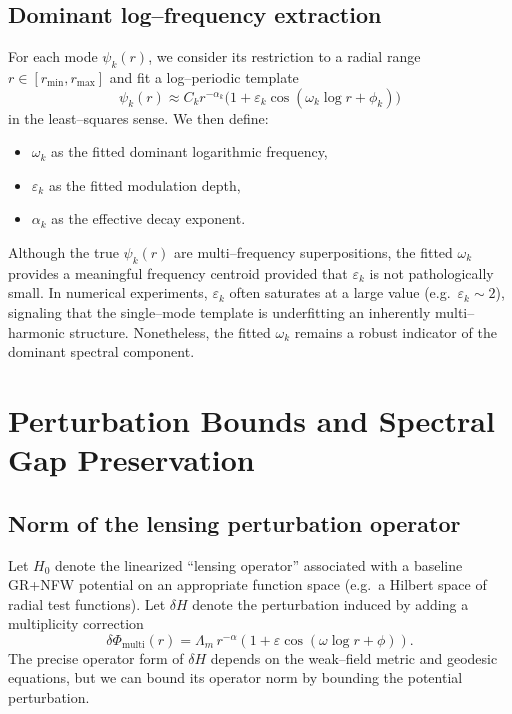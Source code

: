 \documentclass[11pt]{article}
\begin{document}
\subsection{Dominant log--frequency extraction}

For each mode $\psi_k(r)$, we consider its restriction to a radial range $r\in[r_{\min},r_{\max}]$ and fit a log--periodic template
\begin{equation}
\psi_k(r) \approx C_k r^{-\alpha_k}\big(1 + \varepsilon_k \cos(\omega_k \log r + \phi_k)\big)
\end{equation}
in the least--squares sense. We then define:

\begin{itemize}[leftmargin=*]
  \item $\omega_k$ as the fitted dominant logarithmic frequency,
  \item $\varepsilon_k$ as the fitted modulation depth,
  \item $\alpha_k$ as the effective decay exponent.
\end{itemize}

Although the true $\psi_k(r)$ are multi--frequency superpositions, the fitted $\omega_k$ provides a meaningful frequency centroid provided that $\varepsilon_k$ is not pathologically small. In numerical experiments, $\varepsilon_k$ often saturates at a large value (e.g.\ $\varepsilon_k \sim 2$), signaling that the single--mode template is underfitting an inherently multi--harmonic structure. Nonetheless, the fitted $\omega_k$ remains a robust indicator of the dominant spectral component.

\section{Perturbation Bounds and Spectral Gap Preservation}

\subsection{Norm of the lensing perturbation operator}

Let $H_0$ denote the linearized ``lensing operator'' associated with a baseline GR+NFW potential on an appropriate function space (e.g.\ a Hilbert space of radial test functions). Let $\delta H$ denote the perturbation induced by adding a multiplicity correction
\begin{equation}
\delta\Phi_{\text{multi}}(r) = \Lambda_m\, r^{-\alpha}\left(1 + \varepsilon\cos(\omega\log r + \phi)\right).
\end{equation}
The precise operator form of $\delta H$ depends on the weak--field metric and geodesic equations, but we can bound its operator norm by bounding the potential perturbation.
\end{document}
